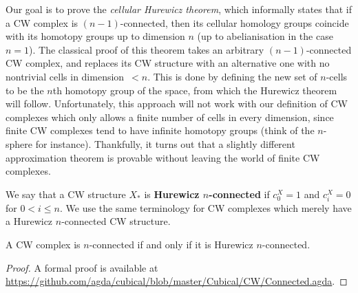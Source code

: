 \documentclass[a4page]{article}
\begin{document}
Our goal is to prove the \emph{cellular Hurewicz theorem}, which informally states that if a CW complex is
\( (n - 1) \)\nobreakdash-connected, then its cellular homology groups coincide with its homotopy groups up to
dimension \( n \) (up to abelianisation in the case \( n = 1 \)).
%
The classical proof of this theorem takes an arbitrary \( (n - 1) \)-connected CW complex, and replaces
its CW structure with an alternative one with no nontrivial cells in dimension~\( < n \).
%
This is done by defining the new set of \( n \)-cells to be the \( n \)th
homotopy group of the space, from which the Hurewicz theorem will follow.
%
Unfortunately, this approach will not work with our definition of CW complexes which only allows
a finite number of cells in every dimension, since finite CW complexes tend to have infinite
homotopy groups (think of the \( n \)-sphere for instance).
%
Thankfully, it turns out that a slightly different approximation theorem is provable without leaving
the world of finite CW complexes.

\begin{definition}
  We say that a CW structure $X_\ast$ is \textbf{Hurewicz $n$-connected} if $c^X_0 = 1$ and $c^X_i = 0$ for $0<i\le n$.
  We use the same terminology for CW complexes which merely have a Hurewicz $n$-connected CW structure.
\end{definition}

\begin{theorem}\label{cor:hurewicz-con}
  A CW complex is $n$-connected if and only if it is Hurewicz $n$-connected.
\end{theorem}

\begin{proof}
A formal proof is available at \url{https://github.com/agda/cubical/blob/master/Cubical/CW/Connected.agda}.
\end{proof}
\end{document}
